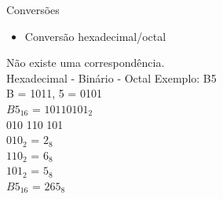 

\begin{frame}{Conversões}
    \begin{itemize}
        \item Conversão hexadecimal/octal
    \end{itemize}
    Não existe uma correspondência. \\[0.2cm]
    Hexadecimal - Binário - Octal
    \vspace{0.2cm}
    Exemplo: B5 \\[0.2cm]
    \centering
    B = 1011, 5 = 0101 \\[0.2cm]
    $B5_{16}$ = $10110101_{2}$ \\[0.2cm]
    010 110 101 \\[0.2cm]
    $010_{2}$ = $2_{8}$ \\[0.2cm]
    $110_{2}$ = $6_{8}$ \\[0.2cm]
    $101_{2}$ = $5_{8}$ \\[0.2cm]
    $B5_{16}$ = $265_{8}$
\end{frame}